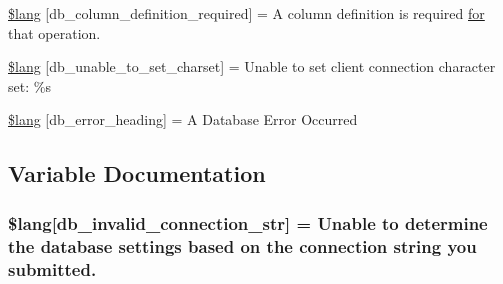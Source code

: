 \begin{DoxyCompactItemize}
\item 
\hyperlink{_admin_2system_2language_2english_2db__lang_8php_ad0ba270704ec81f8f89e486a18660354}{\$lang} \mbox{[}\textquotesingle{}db\+\_\+column\+\_\+definition\+\_\+required\textquotesingle{}\mbox{]} = \textquotesingle{}A column definition is required \hyperlink{confirm__transfer_8php_aaf007b9fa5c90d7c5a7011bece9cfc15}{for} that operation.\textquotesingle{}
\item 
\hyperlink{_admin_2system_2language_2english_2db__lang_8php_ab22396948e25460833329cb8786ad831}{\$lang} \mbox{[}\textquotesingle{}db\+\_\+unable\+\_\+to\+\_\+set\+\_\+charset\textquotesingle{}\mbox{]} = \textquotesingle{}Unable to set client connection character set\+: \%s\textquotesingle{}
\item 
\hyperlink{_admin_2system_2language_2english_2db__lang_8php_a4be34cea2490b0d41689b65e52286658}{\$lang} \mbox{[}\textquotesingle{}db\+\_\+error\+\_\+heading\textquotesingle{}\mbox{]} = \textquotesingle{}A Database Error Occurred\textquotesingle{}
\end{DoxyCompactItemize}


\subsection{Variable Documentation}
\hypertarget{_admin_2system_2language_2english_2db__lang_8php_a0c2ed2613101d37cbaba14042530c16d}{}
\subsubsection[{\$lang}]{\setlength{\rightskip}{0pt plus 5cm}\$lang\mbox{[}\textquotesingle{}db\+\_\+invalid\+\_\+connection\+\_\+str\textquotesingle{}\mbox{]} = \textquotesingle{}Unable to determine the database settings based {\bf on} the connection string you submitted.\textquotesingle{}}\label{_admin_2system_2language_2english_2db__lang_8php_a0c2ed2613101d37cbaba14042530c16d}
\hypertarget{_admin_2system_2language_2english_2db__lang_8php_aa5935b86c957eb15ac7d41cf84143d66}{}
